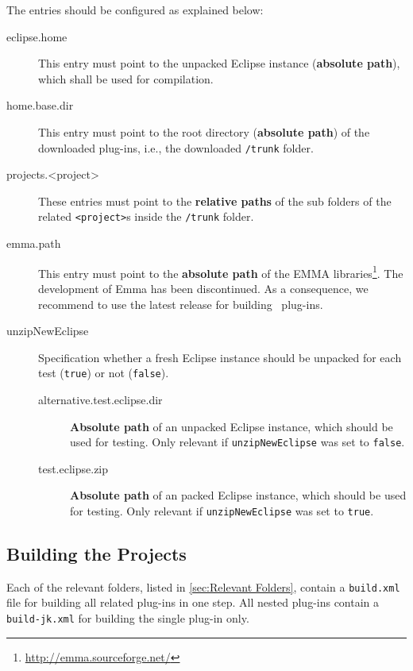 The entries should be configured as explained below:
\begin{description}
	\item[eclipse.home] $ $\\
		This entry must point to the unpacked Eclipse instance (\textbf{absolute path}), which shall be used for compilation.
	\item[home.base.dir] $ $\\
		This entry must point to the root directory (\textbf{absolute path}) of the downloaded plug-ins, i.e., the downloaded \texttt{/trunk} folder.
	\item[projects.<project>] $ $\\
		These entries must point to the \textbf{relative paths} of the sub folders of the related \texttt{<project>}s inside the \texttt{/trunk} folder.
	\item[emma.path] $ $\\
		This entry must point to the \textbf{absolute path} of the EMMA libraries\footnote{\url{http://emma.sourceforge.net/}}. The development of Emma has been discontinued. As a consequence, we recommend to use the latest release for building \EASy\ plug-ins.
	\newpage
	\item[unzipNewEclipse] $ $\\
		Specification whether a fresh Eclipse instance should be unpacked for each test (\texttt{true}) or not (\texttt{false}).	
	\begin{description}
		\item[alternative.test.eclipse.dir] $ $\\
			\textbf{Absolute path} of an unpacked Eclipse instance, which should be used for testing. Only relevant if \texttt{unzipNewEclipse} was set to \texttt{false}.
	\item[test.eclipse.zip] $ $\\
			\textbf{Absolute path} of an packed Eclipse instance, which should be used for testing. Only relevant if \texttt{unzipNewEclipse} was set to \texttt{true}.
	\end{description}
\end{description}

\subsection{Building the Projects}
\label{sec:Local Build}
Each of the relevant folders, listed in \vref{sec:Relevant Folders}, contain a \texttt{build.xml} file for building all related plug-ins in one step. All nested plug-ins contain a \texttt{build-jk.xml} for building the single plug-in only.

